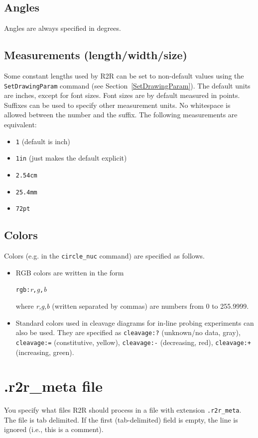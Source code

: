 \documentclass[letterpaper,12pt]{report}
\begin{document}
\subsection{Angles}

Angles are always specified in degrees.

\subsection{Measurements (length/width/size)}
\label{measurements}

Some constant lengths used by R2R can be set to non-default values using the {\tt SetDrawingParam} command (see Section~\ref{SetDrawingParam}). The default units are inches, except for font sizes. Font sizes are by default measured in points.  Suffixes can be used to specify other measurement units.  No whitespace is allowed between the number and the suffix.  The following measurements are equivalent:
\begin{itemize}
\item {\tt 1} (default is inch)
\item {\tt 1in} (just makes the default explicit)
\item {\tt 2.54cm}
\item {\tt 25.4mm}
\item {\tt 72pt}
\end{itemize}

\subsection{Colors}
\label{color}

Colors (e.g. in the {\tt circle\_nuc} command) are specified as follows.  

\begin{itemize}
\item RGB colors are written in the form

{\tt rgb:}\textit{r}{\tt ,}\textit{g}{\tt ,}\textit{b}

where \textit{r,g,b }(written separated by commas) are numbers from 0 to
255.9999.
\item Standard colors used in cleavage diagrams for in-line probing experiments can also be used.  They are specified
as 
{\tt cleavage:?} (unknown/no data, gray), {\tt cleavage:=} (constitutive, yellow), {\tt cleavage:-} (decreasing, red), {\tt cleavage:+} (increasing, green).
\end{itemize}

\section{.r2r\_meta file}
\label{metafile}
You specify what files R2R should process in a file with extension
{\tt .r2r\_meta}.
The file is tab delimited.  If the first (tab-delimited) field is empty,
the line is ignored (i.e., this is a comment).
\end{document}
